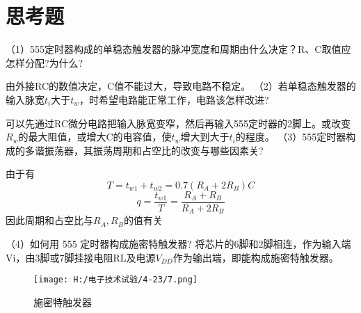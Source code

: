 \documentclass{article}
\begin{document}
\section{思考题}
（1）555定时器构成的单稳态触发器的脉冲宽度和周期由什么决定？R、C取值应怎样分配?为什么?\par
由外接RC的数值决定，C值不能过大，导致电路不稳定。
（2）若单稳态触发器的输入脉宽$t_i$大于$t_w$，时希望电路能正常工作，电路该怎样改进?\par 
可以先通过RC微分电路把输入脉宽变窄，然后再输入555定时器的2脚上。或改变$R_w$的最大阻值，或增大C的电容值，使$t_w$增大到大于$t_i$的程度。
（3）555定时器构成的多谐振荡器，其振荡周期和占空比的改变与哪些因素关?\par 
由于有
\[T=t_{w1}+t_{w2}=0.7(R_A+2R_B)C\]
\[q=\frac{t_{w1}}{T}=\frac{R_A+R_B}{R_A+2R_B}\]
因此周期和占空比与$R_A,R_B$的值有关\par 
（4）如何用 555 定时器构成施密特触发器?
将芯片的6脚和2脚相连，作为输入端Vi，由3脚或7脚挂接电阻RL及电源$V_{DD}$作为输出端，即能构成施密特触发器。
\begin{figure}[h]
  \centering   
  \texttt{[image: H:/电子技术试验/4-23/7.png]}   
  \caption{施密特触发器}   
  \label{fig:side:a}   
\end{figure}
\end{document}
